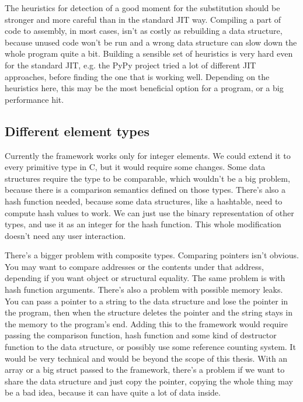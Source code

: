 \documentclass[a4paper,11pt]{article}
\begin{document}
            The heuristics for detection of a good moment for the substitution should be stronger and more careful than
            in the standard JIT way. Compiling a part of code to assembly, in most cases, isn't as costly as
            rebuilding a data structure, because unused code won't be run and a wrong data structure can slow down the
            whole program quite a bit. Building a sensible set of heuristics is very hard even for the standard JIT,
            e.g. the PyPy project tried a lot of different JIT approaches, before finding the one that is working well.
            Depending on the heuristics here, this may be the most beneficial option for a program, or a big performance
            hit.

	\subsection{Different element types}

		Currently the framework works only for integer elements. We could extend it to every primitive type in
		C, but it would require some changes.  Some data structures require the type to be comparable, which
		wouldn't be a big problem, because there is a comparison semantics defined on those types. There's also
		a hash function needed, because some data structures, like a hashtable, need to compute hash values to
		work. We can just use the binary representation of other types, and use it as an integer for the hash
		function. This whole modification doesn't need any user interaction.

		There's a bigger problem with composite types. Comparing pointers isn't obvious. You may want to compare
		addresses or the contents under that address, depending if you want object or structural equality. The
		same problem is with hash function arguments. There's also a problem with possible memory leaks. You can
		pass a pointer to a string to the data structure and lose the pointer in the program, then when the
		structure deletes the pointer and the string stays in the memory to the program's end. Adding this to
		the framework would require passing the comparison function, hash function and some kind of destructor
		function to the data structure, or possibly use some reference counting system. It would be very
		technical and would be beyond the scope of this thesis. With an array or a big struct passed to the
		framework, there's a problem if we want to share the data structure and just copy the pointer, copying
		the whole thing may be a bad idea, because it can have quite a lot of data inside.
\end{document}
